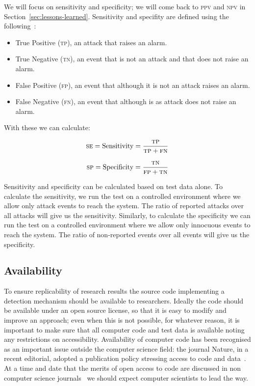 \documentclass[conference]{IEEEtran}
\begin{document}
We will focus on sensitivity and specificity; we will come back to
\textsc{ppv} and \textsc{npv} in Section~\ref{sec:lessons-learned}.
Sensitivity and specifity are defined using the following~\cite{linn2004}:
\begin{itemize}
\item True Positive (\textsc{tp}), an attack that raises an alarm.
\item True Negative (\textsc{tn}), an event that is not an attack and that does
  not raise an alarm.
\item False Positive (\textsc{fp}), an event that although it is not an attack
  raises an alarm.
\item False Negative (\textsc{fn}), an event that although is as attack does
  not raise an alarm.
\end{itemize}

\noindent
With these we can calculate:

\begin{equation}
  \textsc{se} = \textrm{Sensitivity} = \frac{\textsc{tp}}{\textsc{tp}
    + \textsc{fn}}
\label{eq:sensitivity}
\end{equation}

\begin{equation}
  \textsc{sp} = \textrm{Specificity} = \frac{\textsc{tn}}{\textsc{fp}
    + \textsc{tn}}
\label{eq:specificity}
\end{equation}

\noindent
Sensitivity and specificity can be calculated based on test
data alone. To calculate the sensitivity, we run the test on a
controlled environment where we allow only attack events to reach the
system. The ratio of reported attacks over all attacks will give us
the sensitivity. Similarly, to calculate the specificity we can run
the test on a controlled environment where we allow only innocuous
events to reach the system. The ratio of non-reported events over all
events will give us the specificity. 

\subsection{Availability}

To ensure replicability of research results the source code
implementing a detection mechanism should be available to researchers.
Ideally the code should be available under an open source license, so
that it is easy to modify and improve an approach; even when this is
not possible, for whatever reason, it is important to make sure that
all computer code and test data is available noting any restrictions
on accessibility. Availability of computer code has been recognised as
an important issue outside the computer science field: the journal
Nature, in a recent editorial, adopted a publication policy stressing
access to code and data~\cite{nature2014}. At a time and date that the
merits of open access to code are discussed in non computer science
journals~\cite{easterbrook2014} we should expect computer scientists
to lead the way.
 
\end{document}
